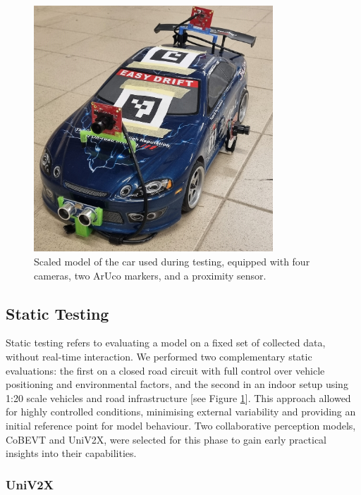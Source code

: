\begin{figure}[ht]
    \centering
    \includegraphics[width=0.8\textwidth]{figures/introduction/scale_car}
    \caption{Scaled model of the car used during testing, equipped with four cameras, two ArUco markers, and a proximity sensor.}
    \label{scale-car}
\end{figure}

\subsection{Static Testing}

Static testing refers to evaluating a model on a fixed set of collected data, without real-time interaction.
We performed two complementary static evaluations: the first on a closed road circuit with full control over vehicle positioning and environmental factors, and the second in an indoor setup using 1:20 scale vehicles and road infrastructure [see Figure \ref{scale-car}].
This approach allowed for highly controlled conditions, minimising external variability and providing an initial reference point for model behaviour.
Two collaborative perception models, CoBEVT\cite{xu2022cobevtcooperativebirdseye} and UniV2X\cite{yu2024_univ2x}, were selected for this phase to gain early practical insights into their capabilities.

\subsubsection{UniV2X}

